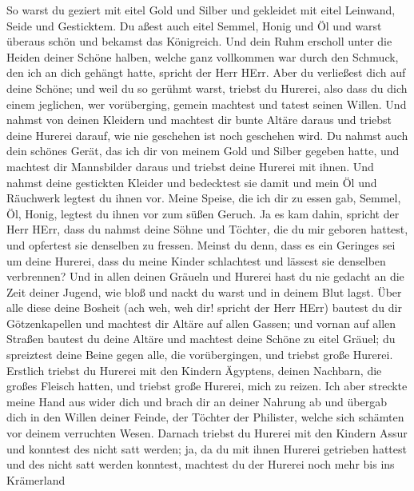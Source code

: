  So warst du geziert mit eitel Gold und Silber und
gekleidet mit eitel Leinwand, Seide und Gesticktem. Du aßest auch eitel
Semmel, Honig und Öl und warst überaus schön und bekamst das Königreich.
 Und dein Ruhm erscholl unter die Heiden deiner Schöne
halben, welche ganz vollkommen war durch den Schmuck, den ich an dich
gehängt hatte, spricht der Herr HErr.  Aber du verließest
dich auf deine Schöne; und weil du so gerühmt warst, triebst du Hurerei,
also dass du dich einem jeglichen, wer vorüberging, gemein machtest und
tatest seinen Willen.  Und nahmst von deinen Kleidern und
machtest dir bunte Altäre daraus und triebst deine Hurerei darauf, wie
nie geschehen ist noch geschehen wird.  Du nahmst auch dein
schönes Gerät, das ich dir von meinem Gold und Silber gegeben hatte, und
machtest dir Mannsbilder daraus und triebst deine Hurerei mit ihnen.
 Und nahmst deine gestickten Kleider und bedecktest sie
damit und mein Öl und Räuchwerk legtest du ihnen vor. 
Meine Speise, die ich dir zu essen gab, Semmel, Öl, Honig, legtest du
ihnen vor zum süßen Geruch. Ja es kam dahin, spricht der Herr HErr,
 dass du nahmst deine Söhne und Töchter, die du mir geboren
hattest, und opfertest sie denselben zu fressen. Meinst du denn, dass es
ein Geringes sei um deine Hurerei,  dass du meine Kinder
schlachtest und lässest sie denselben verbrennen?  Und in
allen deinen Gräueln und Hurerei hast du nie gedacht an die Zeit deiner
Jugend, wie bloß und nackt du warst und in deinem Blut lagst.
 Über alle diese deine Bosheit (ach weh, weh dir! spricht
der Herr HErr)  bautest du dir Götzenkapellen und machtest
dir Altäre auf allen Gassen;  und vornan auf allen Straßen
bautest du deine Altäre und machtest deine Schöne zu eitel Gräuel; du
spreiztest deine Beine gegen alle, die vorübergingen, und triebst große
Hurerei.  Erstlich triebst du Hurerei mit den Kindern
Ägyptens, deinen Nachbarn, die großes Fleisch hatten, und triebst große
Hurerei, mich zu reizen.  Ich aber streckte meine Hand aus
wider dich und brach dir an deiner Nahrung ab und übergab dich in den
Willen deiner Feinde, der Töchter der Philister, welche sich schämten
vor deinem verruchten Wesen.  Darnach triebst du Hurerei
mit den Kindern Assur und konntest des nicht satt werden; ja, da du mit
ihnen Hurerei getrieben hattest und des nicht satt werden konntest,
 machtest du der Hurerei noch mehr bis ins Krämerland
